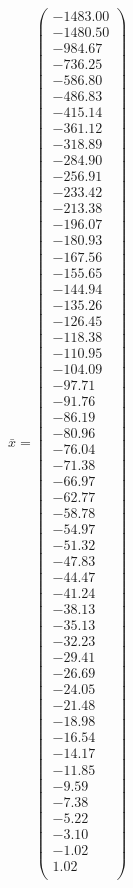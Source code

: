 \documentclass[a4paper,12pt]{article}
\begin{document}
$\bar { x } = \begin{pmatrix}
-1483.00 \\
-1480.50 \\
-984.67 \\
-736.25 \\
-586.80 \\
-486.83 \\
-415.14 \\
-361.12 \\
-318.89 \\
-284.90 \\
-256.91 \\
-233.42 \\
-213.38 \\
-196.07 \\
-180.93 \\
-167.56 \\
-155.65 \\
-144.94 \\
-135.26 \\
-126.45 \\
-118.38 \\
-110.95 \\
-104.09 \\
-97.71 \\
-91.76 \\
-86.19 \\
-80.96 \\
-76.04 \\
-71.38 \\
-66.97 \\
-62.77 \\
-58.78 \\
-54.97 \\
-51.32 \\
-47.83 \\
-44.47 \\
-41.24 \\
-38.13 \\
-35.13 \\
-32.23 \\
-29.41 \\
-26.69 \\
-24.05 \\
-21.48 \\
-18.98 \\
-16.54 \\
-14.17 \\
-11.85 \\
-9.59 \\
-7.38 \\
-5.22 \\
-3.10 \\
-1.02 \\
1.02 \\
\end{pmatrix}
$
\end{document}
